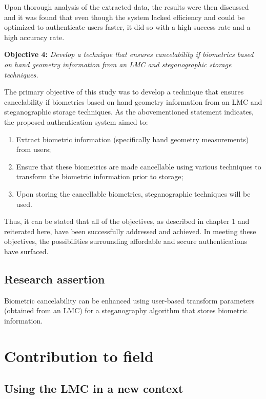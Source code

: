 Upon thorough analysis of the extracted data, the results were then discussed and it was found that even though the system lacked efficiency and could be optimized to authenticate users faster, it did so with a high success rate and a high accuracy rate.


\textbf{Objective 4:} \textit{Develop a technique that ensures cancelability if biometrics based on hand geometry information from an LMC and steganographic storage techniques.}


The primary objective of this study was to develop a technique that ensures cancelability if biometrics based on hand geometry information from an LMC and steganographic storage techniques. As the abovementioned statement indicates, the proposed authentication system aimed to:

\begin{enumerate}[label=\roman*.]
    \item Extract biometric information (specifically hand geometry measurements) from users;
    \item Ensure that these biometrics are made cancellable using various techniques to transform the biometric information prior to storage; 
    \item Upon storing the cancellable biometrics, steganographic techniques will be used.
\end{enumerate}

Thus, it can be stated that all of the objectives, as described in chapter 1 and reiterated here, have been successfully addressed and achieved. In meeting these objectives, the possibilities surrounding affordable and secure authentications have surfaced. 


\subsection{Research assertion}

Biometric cancelability can be enhanced using user-based transform parameters (obtained from an LMC) for a steganography algorithm that stores biometric information.

\section{Contribution to field}

\subsection{Using the LMC in a new context}

